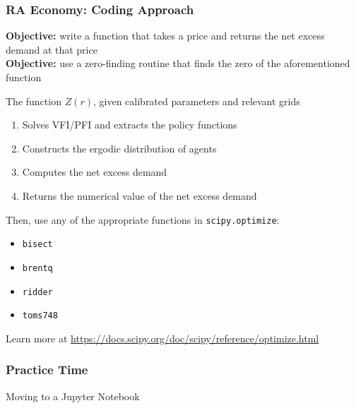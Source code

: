 \documentclass[10pt, aspectratio=1610, natbib, handout]{beamer}
\begin{document}
  \begin{frame}
    \frametitle{RA Economy: Coding Approach}

    \textbf{Objective:} write a function that takes a price and returns the net excess demand at that price \\
    \textbf{Objective:} use a zero-finding routine that finds the zero of the aforementioned function

    \vfill\pause

    The function $Z(r)$, given calibrated parameters and relevant grids
    \begin{enumerate}
      \item Solves VFI/PFI and extracts the policy functions
      \item \alert{Constructs the ergodic distribution of agents}
      \item Computes the net excess demand
      \item Returns the numerical value of the net excess demand
    \end{enumerate}

    \vfill\pause

    Then, use any of the appropriate functions in \texttt{scipy.optimize}:
    \begin{itemize}
      \item \texttt{bisect}
      \item \texttt{brentq}
      \item \texttt{ridder}
      \item \texttt{toms748}
    \end{itemize}

    \vfill

    Learn more at \url{https://docs.scipy.org/doc/scipy/reference/optimize.html}

  \end{frame}

  \begin{frame}
    \frametitle{Practice Time}

    Moving to a Jupyter Notebook

  \end{frame}
\end{document}
